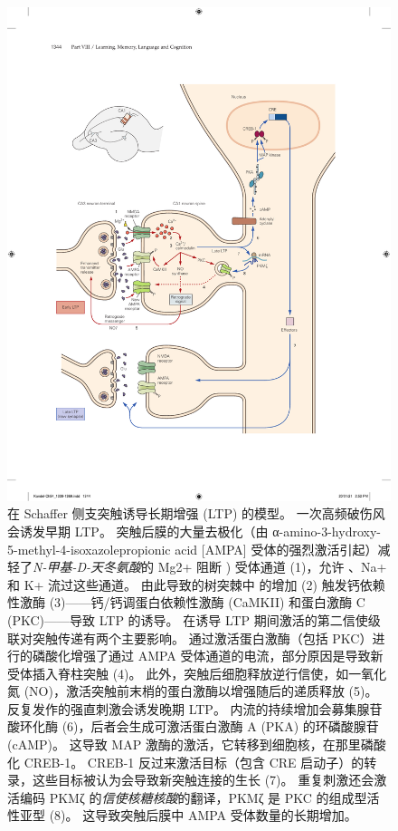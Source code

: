 \begin{figure}[htbp]
	\centering
	\includegraphics[width=0.9\linewidth]{chap54/fig_54_3}
	\caption{在 Schaffer 侧支突触诱导长期增强 (LTP) 的模型。 一次高频破伤风会诱发早期 LTP。 突触后膜的大量去极化（由 α-amino-3-hydroxy-5-methyl-4-isoxazolepropionic acid [AMPA] 受体的强烈激活引起）减轻了\textit{N-甲基-D-天冬氨酸}的 Mg2+ 阻断 ) 受体通道 (1)，允许 、Na+ 和 K+ 流过这些通道。 由此导致的树突棘中  的增加 (2) 触发钙依赖性激酶 (3)——钙/钙调蛋白依赖性激酶 (CaMKII) 和蛋白激酶 C (PKC)——导致 LTP 的诱导。 在诱导 LTP 期间激活的第二信使级联对突触传递有两个主要影响。 通过激活蛋白激酶（包括 PKC）进行的磷酸化增强了通过 AMPA 受体通道的电流，部分原因是导致新受体插入脊柱突触 (4)。 此外，突触后细胞释放逆行信使，如一氧化氮 (NO)，激活突触前末梢的蛋白激酶以增强随后的递质释放 (5)。 反复发作的强直刺激会诱发晚期 LTP。  内流的持续增加会募集腺苷酸环化酶 (6)，后者会生成可激活蛋白激酶 A (PKA) 的环磷酸腺苷 (cAMP)。 这导致 MAP 激酶的激活，它转移到细胞核，在那里磷酸化 CREB-1。 CREB-1 反过来激活目标（包含 CRE 启动子）的转录，这些目标被认为会导致新突触连接的生长 (7)。 重复刺激还会激活编码 PKMζ 的\textit{信使核糖核酸}的翻译，PKMζ 是 PKC 的组成型活性亚型 (8)。 这导致突触后膜中 AMPA 受体数量的长期增加。}
	\label{fig:54_3}
\end{figure}


